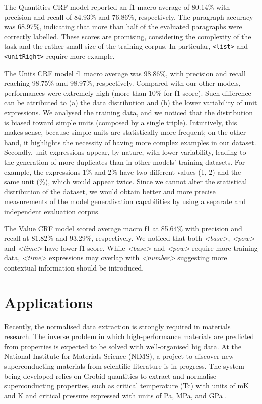\documentclass[sigconf]{acmart}
\begin{document}
The Quantities CRF model reported an f1 macro average of 80.14\% with precision and recall of 84.93\% and 76.86\%, respectively. The paragraph accuracy was 68.97\%, indicating that more than half of the evaluated paragraphs were correctly labelled. These scores are promising, considering the complexity of the task and the rather small size of the training corpus. In particular, \texttt{<list>} and \texttt{<unitRight>} require more example. 

The Units CRF model f1 macro average was 98.86\%, with precision and recall reaching 98.75\% and 98.97\%, respectively. Compared with our other models, performances were extremely high (more than 10\% for f1 score). 
Such difference can be attributed to (a) the data distribution and (b) the lower variability of unit expressions. We analysed the training data, and we noticed that the distribution is biased toward simple units (composed by a single triple). Intuitively, this makes sense, because simple units are statistically more frequent; on the other hand, it highlights the necessity of having more complex examples in our dataset. 
Secondly, unit expressions appear, by nature, with lower variability, leading to the generation of more duplicates than in other models' training datasets. For example, the expressions 1\% and 2\% have two different values (1, 2) and the same unit (\%), which would appear twice. 
Since we cannot alter the statistical distribution of the dataset, we would obtain better and more precise measurements of the model generalisation capabilities by using a separate and independent evaluation corpus. 

The Value CRF model scored average macro f1 at 85.64\% with precision and recall at 81.82\% and 93.29\%, respectively.
We noticed that both \textit{<base>}, \textit{<pow>} and \textit{<time>} have lower f1-score. While \textit{<base>} and \textit{<pow>} require more training data, \textit{<time>} expressions may overlap with \textit{<number>} suggesting more contextual information should be introduced. 


\section{Applications}
\label{sec:use_cases}
Recently, the normalised data extraction is strongly required in materials research. The inverse problem in which high-performance materials are predicted from properties is expected to be solved with well-organised big data. At the National Institute for Materials Science (NIMS), a project to discover new superconducting materials from scientific literature is in progress. The system being developed relies on Grobid-quantities to extract and normalise superconducting properties, such as critical temperature (Tc) with units of mK and K and critical pressure expressed with units of Pa, MPa, and GPa \cite{foppiano2019proposal}. 
\end{document}
